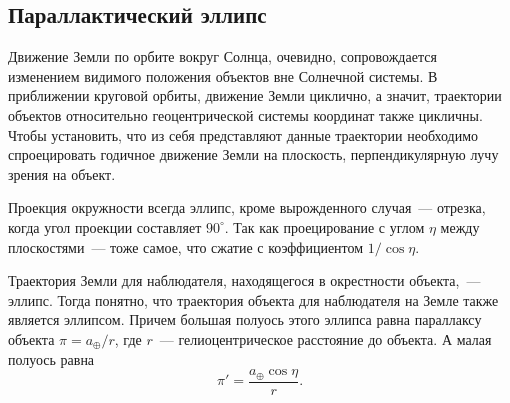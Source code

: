 \subsection{Параллактический эллипс}
Движение Земли по орбите вокруг Солнца, очевидно, сопровождается изменением видимого положения объектов вне Солнечной системы. В приближении круговой орбиты, движение Земли циклично, а значит, траектории объектов относительно геоцентрической системы координат также цикличны. Чтобы установить, что из себя представляют данные траектории необходимо спроецировать годичное движение Земли на плоскость, перпендикулярную лучу зрения на объект.

Проекция окружности всегда эллипс, кроме вырожденного случая~--- отрезка, когда угол проекции составляет $90^\circ$. Так как проецирование с углом $\eta$ между плоскостями~--- тоже самое, что сжатие с коэффициентом $1/\cos\eta$.

Траектория Земли для наблюдателя, находящегося в окрестности объекта,~--- эллипс. Тогда понятно, что траектория объекта для наблюдателя на Земле также является эллипсом. Причем большая полуось этого эллипса равна параллаксу объекта $\pi = a_\oplus / r$, где $r$~--- гелиоцентрическое расстояние до объекта. А малая полуось равна
\begin{equation*}
	\pi' = \frac{a_\oplus \cos \eta}{r}.
\end{equation*}

\begin{figure}[h!]
	\centering
	\caption{}
\end{figure}


